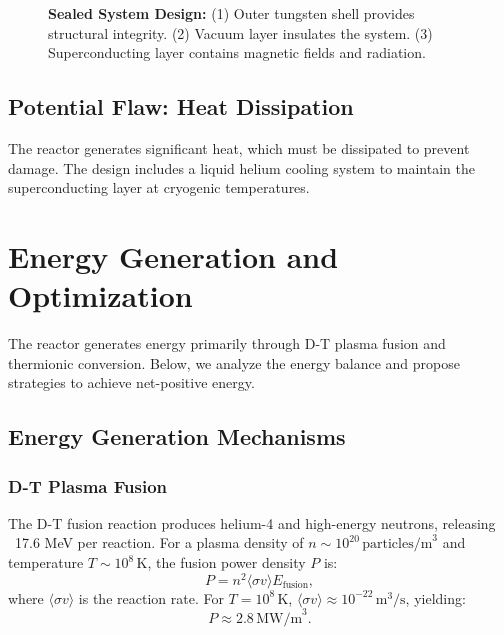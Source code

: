\documentclass[12pt, a4paper]{article}
\begin{document}
\begin{figure}[H]
\centering
{}
\caption{
\textbf{Sealed System Design:} 
(1) Outer tungsten shell provides structural integrity. 
(2) Vacuum layer insulates the system. 
(3) Superconducting layer contains magnetic fields and radiation.
}
\label{fig:sealed_system}
\end{figure}

\subsection{Potential Flaw: Heat Dissipation}
The reactor generates significant heat, which must be dissipated to prevent damage. The design includes a liquid helium cooling system to maintain the superconducting layer at cryogenic temperatures.

\section{Energy Generation and Optimization}
The reactor generates energy primarily through D-T plasma fusion and thermionic conversion. Below, we analyze the energy balance and propose strategies to achieve net-positive energy.

\subsection{Energy Generation Mechanisms}
\subsubsection{D-T Plasma Fusion}
The D-T fusion reaction produces helium-4 and high-energy neutrons, releasing ~17.6 MeV per reaction. For a plasma density of \( n \sim 10^{20} \, \text{particles/m}^3 \) and temperature \( T \sim 10^8 \, \text{K} \), the fusion power density \( P \) is:
\[
P = n^2 \langle \sigma v \rangle E_{\text{fusion}},
\]
where \( \langle \sigma v \rangle \) is the reaction rate. For \( T = 10^8 \, \text{K} \), \( \langle \sigma v \rangle \approx 10^{-22} \, \text{m}^3/\text{s} \), yielding:
\[
P \approx 2.8 \, \text{MW/m}^3.
\]
\end{document}
